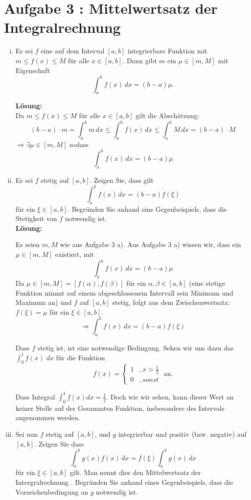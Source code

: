 \documentclass[11pt,a4paper,ngerman]{article}
\begin{document}
\section*{Aufgabe 3 : \mdseries Mittelwertsatz der Integralrechnung}

\begin{enumerate}[i)]
    \item Es sei $f$ eine auf dem Interval $[a,b]$ integrierbare Funktion mit $m \leq f(x) \leq M$ für alle $x\in[a,b]$. Dann gibt es ein $\mu \in [m,M]$ mit Eigenschaft
$$
    \int_{a}^{b} f(x) \, dx = (b - a) \mu.
$$

\textbf{Lösung:}\\
Da $m \leq f(x) \leq M$ für alle $x\in[a,b]$ gilt die Abschätzung:
$$
    (b-a)\cdot m = \int_{a}^{b} m \, dx \leq \int_{a}^{b} f(x) \, dx \leq \int_{a}^{b} M \, dx = (b-a) \cdot M
$$
$\Rightarrow \exists \mu \in \left[m,M\right]$ sodass
$$
    \int_{a}^{b} f(x) \, dx = (b - a) \mu
$$

    \item Es sei $f$ stetig auf $[a,b]$. Zeigen Sie, dass gilt 
$$
    \int_{a}^{b} f(x)\, dx = (b-a) f(\xi)
$$
für ein $\xi\in [a,b]$. Begründen Sie anhand eins Gegenbeispiels, dass die Stetigkeit von $f$ notwendig ist.\\

\textbf{Lösung:}

Es seien $m,M$ wie aus Aufgabe 3 a). Aus Aufgabe 3 a) wissen wir, dass ein $\mu \in \left[m,M\right]$ existiert, mit
$$
    \int_{a}^{b} f(x) \, dx = (b - a) \mu
$$
Da $\mu \in \left[m,M\right] = \left[f(\alpha),f(\beta)\right]$ für ein $\alpha,\beta \in [a,b]$ (eine stetige Funktion nimmt auf einem abgeschlossenem Intervall sein Minimum und Maximum an) und $f$ auf $\left[a,b\right]$ stetig, folgt aus dem Zwischenwertsatz: $f(\xi) = \mu$ für ein $\xi \in \left[a,b\right]$.
$$
    \Rightarrow \int_{a}^{b} f(x)\, dx = (b-a) f(\xi)
$$

Dass $f$ stetig ist, ist eine notwendige Bedingung. Sehen wir uns dazu das  $\int_0^1 f(x)\;dx$ für die Funktion
$$
f(x) = \left\{ 
\begin{array}{rl}
1 & ,x > \frac{1}{2} \\
0 &, sonst 
\end{array}
\right. \text{ an.}
$$

Dass Integral $\int_0^1 f(x) dx = \frac{1}{2}$. Doch wie wir sehen, kann dieser Wert an keiner Stelle auf der Gesammten Funktion, insbesondere des Intervals angenommen werden.

    \item Sei nun $f$ stetig auf $[a,b]$, und $g$ integrierbar und positiv (bzw. negativ) auf $[a,b]$. Zeigen Sie dass 
$$
    \int_{a}^{b} g(x)f(x)\, dx = f(\xi) \int_{a}^{b} g(x) \, dx
$$ 
für ein $\xi \in [a,b]$ gilt. Man nennt dies den Mittelwertsatz der Intergralrechnung   . Begründen Sie anhand eines Gegenbeispiels, dass die Vorzeichenbedingung an $g$ notwendig ist. \\


\end{enumerate}
\end{document}
